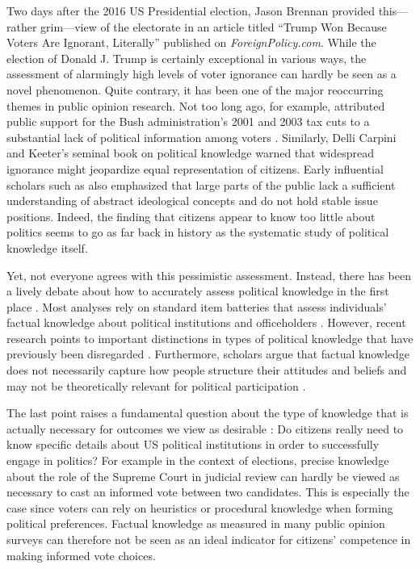 \documentclass[12pt]{article}
\begin{document}
Two days after the 2016 US Presidential election, Jason Brennan provided this--- rather grim---view of the electorate in an article titled ``Trump Won Because Voters Are Ignorant, Literally'' published on \textit{ForeignPolicy.com}. While the election of Donald J. Trump is certainly exceptional in various ways, the assessment of alarmingly high levels of voter ignorance can hardly be seen as a novel phenomenon. Quite contrary, it has been one of the major reoccurring themes in public opinion research. Not too long ago, for example, \citet{bartels2005homer} attributed public support for the Bush administration's 2001 and 2003 tax cuts to a substantial lack of political information among voters \citep[but see][]{lupia2007were,bartels2007homer}. Similarly, Delli Carpini and Keeter's \citeyearpar{carpini1996americans} seminal book on political knowledge warned that widespread ignorance might jeopardize equal representation of citizens. Early influential scholars such as \citet{converse1964nature} also emphasized that large parts of the public lack a sufficient understanding of abstract ideological concepts and do not hold stable issue positions. Indeed, the finding that citizens appear to know too little about politics seems to go as far back in history as the systematic study of political knowledge itself.

Yet, not everyone agrees with this pessimistic assessment. Instead, there has been a lively debate about how to accurately assess political knowledge in the first place \citep[e.g.][]{mondak2000reconsidering,mondak2001asked,sturgis2008experiment,debell2013harder,pietryka2013analysis}. Most analyses rely on standard item batteries that assess individuals' factual knowledge about political institutions and officeholders \citep[e.g.,][]{carpini1996americans}. However, recent research points to important distinctions in types of political knowledge that have previously been disregarded \citep{barabas2014question}. Furthermore, scholars argue that factual knowledge does not necessarily capture how people structure their attitudes and beliefs \citep[e.g.][]{luskin1987measuring} and may not be theoretically relevant for political participation \citep{lupia2006elitism}.

The last point raises a fundamental question about the type of knowledge that is actually necessary for outcomes we view as desirable \citep[see also][]{lupia2015uninformed}: Do citizens really need to know specific details about US political institutions in order to successfully engage in politics? For example in the context of elections, precise knowledge about the role of the Supreme Court in judicial review can hardly be viewed as necessary to cast an informed vote between two candidates. This is especially the case since voters can rely on heuristics \citep{lupia1994shortcuts} or procedural knowledge \citep{prior2008money} when forming political preferences. Factual knowledge as measured in many public opinion surveys can therefore not be seen as an ideal indicator for citizens' competence in making informed vote choices.
\end{document}
